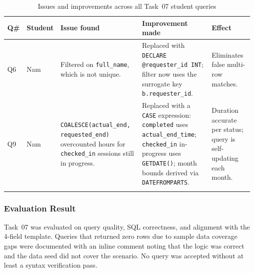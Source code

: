 \begin{table}[http]
\centering
\footnotesize
\renewcommand{\arraystretch}{1.4}
\begin{tabularx}{\textwidth}{>{\raggedright\arraybackslash}p{0.6cm}
                             >{\raggedright\arraybackslash}p{1.2cm}
                             >{\raggedright\arraybackslash}p{3.2cm}
                             >{\raggedright\arraybackslash}X
                             >{\raggedright\arraybackslash}p{2.6cm}}
\toprule
\textbf{Q\#} & \textbf{Student} & \textbf{Issue found} & \textbf{Improvement made} & \textbf{Effect} \\
\midrule

Q6 & Nam &
Filtered on \texttt{full\_name}, which is not unique. &
Replaced with \texttt{DECLARE @requester\_id INT}; filter now uses the
surrogate key \texttt{b.requester\_id}. &
Eliminates false multi-row matches. \\


\addlinespace[0.4em]


Q9 & Nam &
\texttt{COALESCE(actual\_end, requested\_end)} overcounted
hours for \texttt{checked\_in} sessions still in progress. &
Replaced with a \texttt{CASE} expression: \texttt{completed} uses
\texttt{actual\_end\_time}; \texttt{checked\_in} in-progress uses
\texttt{GETDATE()}; month bounds derived via \texttt{DATEFROMPARTS}. &
Duration accurate per status; query is self-updating each month. \\

\addlinespace[0.4em]


\bottomrule
\end{tabularx}
\caption{Issues and improvements across all Task~07 student queries}
\label{tab:task07-improvements}
\end{table}

\subsubsection{Evaluation Result}

Task~07 was evaluated on query quality, SQL correctness, and alignment with the
4-field template.
Queries that returned zero rows due to sample data coverage gaps were documented
with an inline comment noting that the logic was correct and the data seed did
not cover the scenario. No query was accepted without at least a syntax
verification pass.

\newpage




